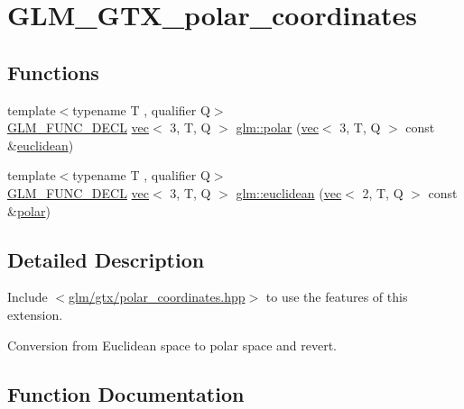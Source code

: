 \hypertarget{group__gtx__polar__coordinates}{}\section{G\+L\+M\+\_\+\+G\+T\+X\+\_\+polar\+\_\+coordinates}
\label{group__gtx__polar__coordinates}
\subsection*{Functions}
\begin{DoxyCompactItemize}
\item 
{\footnotesize template$<$typename T , qualifier Q$>$ }\\\mbox{\hyperlink{setup_8hpp_ab2d052de21a70539923e9bcbf6e83a51}{G\+L\+M\+\_\+\+F\+U\+N\+C\+\_\+\+D\+E\+CL}} \mbox{\hyperlink{structglm_1_1vec}{vec}}$<$ 3, T, Q $>$ \mbox{\hyperlink{group__gtx__polar__coordinates_gab83ac2c0e55b684b06b6c46c28b1590d}{glm\+::polar}} (\mbox{\hyperlink{structglm_1_1vec}{vec}}$<$ 3, T, Q $>$ const \&\mbox{\hyperlink{group__gtx__polar__coordinates_ga1821d5b3324201e60a9e2823d0b5d0c8}{euclidean}})
\item 
{\footnotesize template$<$typename T , qualifier Q$>$ }\\\mbox{\hyperlink{setup_8hpp_ab2d052de21a70539923e9bcbf6e83a51}{G\+L\+M\+\_\+\+F\+U\+N\+C\+\_\+\+D\+E\+CL}} \mbox{\hyperlink{structglm_1_1vec}{vec}}$<$ 3, T, Q $>$ \mbox{\hyperlink{group__gtx__polar__coordinates_ga1821d5b3324201e60a9e2823d0b5d0c8}{glm\+::euclidean}} (\mbox{\hyperlink{structglm_1_1vec}{vec}}$<$ 2, T, Q $>$ const \&\mbox{\hyperlink{group__gtx__polar__coordinates_gab83ac2c0e55b684b06b6c46c28b1590d}{polar}})
\end{DoxyCompactItemize}


\subsection{Detailed Description}
Include $<$\mbox{\hyperlink{polar__coordinates_8hpp}{glm/gtx/polar\+\_\+coordinates.\+hpp}}$>$ to use the features of this extension.

Conversion from Euclidean space to polar space and revert. 

\subsection{Function Documentation}
\mbox{\label{group__gtx__polar__coordinates_ga1821d5b3324201e60a9e2823d0b5d0c8}} 
